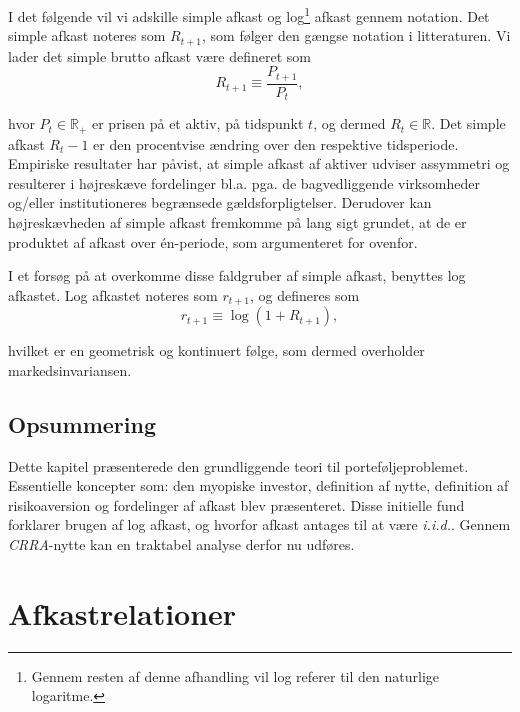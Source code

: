\documentclass[
  a4paper,
  oneside]{memoir}
\begin{document}
I det følgende vil vi adskille simple afkast og log\footnote{Gennem resten af denne afhandling vil log referer til den naturlige logaritme.} afkast gennem notation. Det simple afkast noteres som \(R_{t+1}\), som følger den gængse notation i litteraturen. Vi lader det simple brutto afkast være defineret som
\[R_{t+1}\equiv\frac{P_{t+1}}{P_t},\]

hvor \(P_t\in\mathbb{R}_+\) er prisen på et aktiv, på tidspunkt \(t\), og dermed \(R_t\in\mathbb{R}\). Det simple afkast \(R_t-1\) er den procentvise ændring over den respektive tidsperiode. Empiriske resultater har påvist, at simple afkast af aktiver udviser assymmetri og resulterer i højreskæve fordelinger bl.a. pga. de bagvedliggende virksomheder og/eller institutioneres begrænsede gældsforpligtelser. Derudover kan højreskævheden af simple afkast fremkomme på lang sigt grundet, at de er produktet af afkast over én-periode, som argumenteret for ovenfor.

I et forsøg på at overkomme disse faldgruber af simple afkast, benyttes log afkastet. Log afkastet noteres som \(r_{t+1}\), og defineres som
\[r_{t+1}\equiv\log(1+R_{t+1}),\]

hvilket er en geometrisk og kontinuert følge, som dermed overholder markedsinvariansen.

\hypertarget{opsunteo}{%
\section{Opsummering}\label{opsunteo}}

Dette kapitel præsenterede den grundliggende teori til porteføljeproblemet. Essentielle koncepter som: den myopiske investor, definition af nytte, definition af risikoaversion og fordelinger af afkast blev præsenteret. Disse initielle fund forklarer brugen af log afkast, og hvorfor afkast antages til at være \emph{i.i.d.}. Gennem \emph{CRRA}-nytte kan en traktabel analyse derfor nu udføres.

\hypertarget{afkrel}{%
\chapter{Afkastrelationer}\label{afkrel}}
\end{document}
